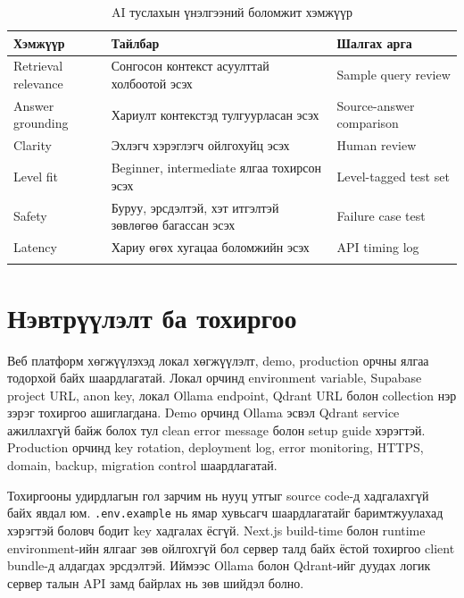 \begin{longtable}{|p{}|p{}|p{}|}
  \hline
  \textbf{Хэмжүүр} & \textbf{Тайлбар} & \textbf{Шалгах арга} \\ \hline
  Retrieval relevance & Сонгосон контекст асуулттай холбоотой эсэх & Sample query review \\ \hline
  Answer grounding & Хариулт контекстэд тулгуурласан эсэх & Source-answer comparison \\ \hline
  Clarity & Эхлэгч хэрэглэгч ойлгохуйц эсэх & Human review \\ \hline
  Level fit & Beginner, intermediate ялгаа тохирсон эсэх & Level-tagged test set \\ \hline
  Safety & Буруу, эрсдэлтэй, хэт итгэлтэй зөвлөгөө багассан эсэх & Failure case test \\ \hline
  Latency & Хариу өгөх хугацаа боломжийн эсэх & API timing log \\ \hline
  \caption{AI туслахын үнэлгээний боломжит хэмжүүр}
  \label{tab:ai-evaluation-metrics}
\end{longtable}

\section{Нэвтрүүлэлт ба тохиргоо}
Веб платформ хөгжүүлэхэд локал хөгжүүлэлт, demo, production орчны ялгаа тодорхой байх шаардлагатай. Локал орчинд environment variable, Supabase project URL, anon key, локал Ollama endpoint, Qdrant URL болон collection нэр зэрэг тохиргоо ашиглагдана. Demo орчинд Ollama эсвэл Qdrant service ажиллахгүй байж болох тул clean error message болон setup guide хэрэгтэй. Production орчинд key rotation, deployment log, error monitoring, HTTPS, domain, backup, migration control шаардлагатай.

Тохиргооны удирдлагын гол зарчим нь нууц утгыг source code-д хадгалахгүй байх явдал юм. \texttt{.env.example} нь ямар хувьсагч шаардлагатайг баримтжуулахад хэрэгтэй боловч бодит key хадгалах ёсгүй. Next.js build-time болон runtime environment-ийн ялгааг зөв ойлгохгүй бол сервер талд байх ёстой тохиргоо client bundle-д алдагдах эрсдэлтэй. Иймээс Ollama болон Qdrant-ийг дуудах логик сервер талын API замд байрлах нь зөв шийдэл болно.

